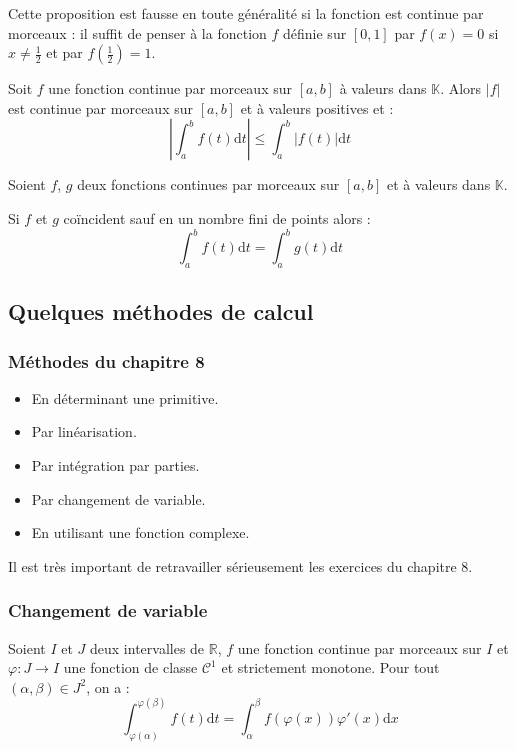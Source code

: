 \documentclass[french,11pt,twoside]{VcCours}
\newcommand{\dx}{\text{d}x}
\newcommand{\dt}{\text{d}t}
\begin{document}
\begin{Remarque}[\alerte]{} Cette proposition est fausse en toute généralité si la fonction est continue par morceaux : il suffit de penser à la fonction $f$ définie sur $[0,1]$ par $f(x)=0$ si $x \neq \frac{1}{2}$ et par $f(\frac{1}{2})=1$.
\end{Remarque}

\begin{Proposition}{} Soit $f$ une fonction continue par morceaux sur $[a,b]$ à valeurs dans $\mathbb{K}$. Alors $\vert f \vert$ est continue par morceaux sur $[a,b]$ et à valeurs positives et :
$$ \left\vert \int_{a}^b f(t) \dt \right\vert \leq \int_{a}^b \vert f(t) \vert \dt $$
\end{Proposition}

\begin{Proposition}{} Soient $f$, $g$ deux fonctions continues par morceaux sur $[a,b]$ et à valeurs dans $\mathbb{K}$. 
	
Si $f$ et $g$ coïncident sauf en un nombre fini de points alors :
$$ \int_{a}^b f(t) \dt = \int_{a}^b g(t) \dt $$
\end{Proposition}

\subsection{Quelques méthodes de calcul}
\subsubsection{Méthodes du chapitre 8}

\begin{itemize}
\item En déterminant une primitive.
\item Par linéarisation.
\item Par intégration par parties.
\item Par changement de variable.
\item En utilisant une fonction complexe.
\end{itemize}

Il est très important de retravailler sérieusement les exercices du chapitre 8. 

\subsubsection{Changement de variable}

\begin{Proposition}{} Soient $I$ et $J$ deux intervalles de $\mathbb{R}$, $f$ une fonction continue par morceaux sur $I$ et $\varphi : J \rightarrow I$ une fonction de classe $\mathcal{C}^1$ et strictement monotone. Pour tout $(\alpha, \beta) \in J^2$, on a :
$$ \int_{\varphi(\alpha)}^{\varphi(\beta)} f(t) \dt = \int_{\alpha}^{\beta} f( \varphi(x)) \varphi'(x) \dx$$
\end{Proposition}
\end{document}
